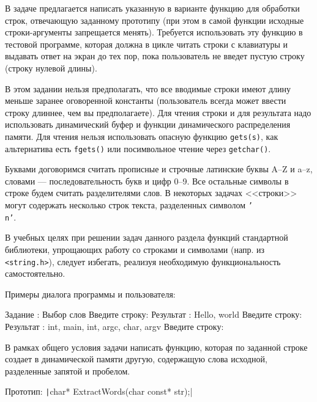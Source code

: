 
В задаче предлагается написать указанную в варианте функцию для обработки строк,
отвечающую заданному прототипу (при этом в самой функции исходные строки-аргументы
запрещается менять). Требуется использовать эту функцию в тестовой программе,
которая должна в цикле читать строки с клавиатуры и выдавать ответ на экран до
тех пор, пока пользователь не введет пустую строку (строку нулевой длины). 

В этом задании нельзя предполагать, что все вводимые строки имеют длину меньше
заранее оговоренной константы (пользователь всегда может ввести строку длиннее,
чем вы предполагаете). Для чтения строки и для результата надо использовать
динамический буфер и функции динамического распределения памяти. Для чтения
нельзя использовать опасную функцию \texttt{gets(s)}, как альтернатива есть \texttt{fgets()} или
посимвольное чтение через \texttt{getchar()}.

Буквами договоримся считать прописные и строчные латинские буквы 
A--Z и a--z, словами --- последовательность букв и цифр 0--9. Все остальные
символы в строке будем считать разделителями слов. В некоторых задачах <<строки>>
могут содержать несколько строк текста, разделенных символом \texttt{'\\n'}.

В учебных целях при решении задач данного раздела функций стандартной
библиотеки, упрощающих работу со строками и символами (напр. из 
\texttt{<string.h>}), следует избегать, реализуя необходимую
функциональность самостоятельно.

Примеры диалога программы и пользователя:

\begin{zzoutput}
  Задание : Выбор слов
  Введите строку: 
  Результат     : Hello, world
  Введите строку: 
  Результат     : int, main, int, argc, char, argv
  Введите строку: \zzuser{ }
\end{zzoutput}


\bigskip


\begin{zztask}
В рамках общего условия задачи написать функцию, которая по заданной строке
создает в динамической памяти другую, содержащую слова исходной,
разделенные запятой и пробелом.

Прототип: \texttt|char* ExtractWords(char const* str);|
\end{zztask}

